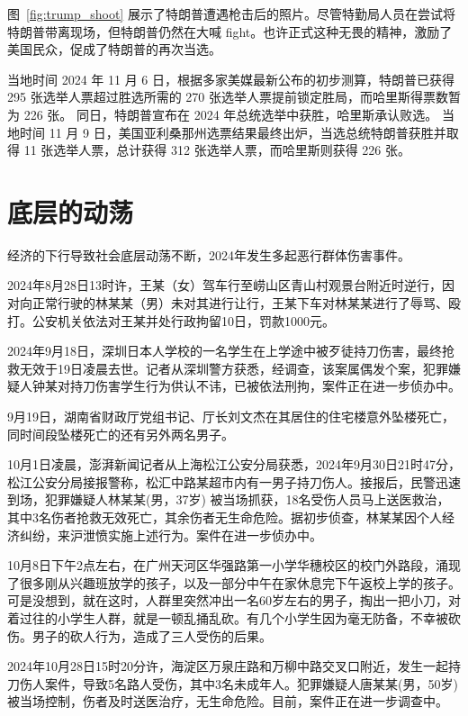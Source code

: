 图~\ref{fig:trump_shoot} 展示了特朗普遭遇枪击后的照片。尽管特勤局人员在尝试将特朗普带离现场，但特朗普仍然在大喊 fight。也许正式这种无畏的精神，激励了美国民众，促成了特朗普的再次当选。

当地时间 2024 年 11 月 6 日，根据多家美媒最新公布的初步测算，特朗普已获得 295 张选举人票超过胜选所需的 270 张选举人票提前锁定胜局，而哈里斯得票数暂为 226 张。 同日，特朗普宣布在 2024 年总统选举中获胜，哈里斯承认败选。 当地时间 11 月 9 日，美国亚利桑那州选票结果最终出炉，当选总统特朗普获胜并取得 11 张选举人票，总计获得 312 张选举人票，而哈里斯则获得 226 张。

\section{底层的动荡}

经济的下行导致社会底层动荡不断，2024年发生多起恶行群体伤害事件。

2024年8月28日13时许，王某（女）驾车行至崂山区青山村观景台附近时逆行，因对向正常行驶的林某某（男）未对其进行让行，王某下车对林某某进行了辱骂、殴打。公安机关依法对王某并处行政拘留10日，罚款1000元。

2024年9月18日，深圳日本人学校的一名学生在上学途中被歹徒持刀伤害，最终抢救无效于19日凌晨去世。记者从深圳警方获悉，经调查，该案属偶发个案，犯罪嫌疑人钟某对持刀伤害学生行为供认不讳，已被依法刑拘，案件正在进一步侦办中。

9月19日，湖南省财政厅党组书记、厅长刘文杰在其居住的住宅楼意外坠楼死亡，同时间段坠楼死亡的还有另外两名男子。

10月1日凌晨，澎湃新闻记者从上海松江公安分局获悉，2024年9月30日21时47分，松江公安分局接报警称，松汇中路某超市内有一男子持刀伤人。接报后，民警迅速到场，犯罪嫌疑人林某某(男，37岁) 被当场抓获，18名受伤人员马上送医救治，其中3名伤者抢救无效死亡，其余伤者无生命危险。据初步侦查，林某某因个人经济纠纷，来沪泄愤实施上述行为。案件在进一步侦办中。

10月8日下午2点左右，在广州天河区华强路第一小学华穗校区的校门外路段，涌现了很多刚从兴趣班放学的孩子，以及一部分中午在家休息完下午返校上学的孩子。可是没想到，就在这时，人群里突然冲出一名60岁左右的男子，掏出一把小刀，对着过往的小学生人群，就是一顿乱捅乱砍。有几个小学生因为毫无防备，不幸被砍伤。男子的砍人行为，造成了三人受伤的后果。

2024年10月28日15时20分许，海淀区万泉庄路和万柳中路交叉口附近，发生一起持刀伤人案件，导致5名路人受伤，其中3名未成年人。犯罪嫌疑人唐某某(男，50岁)被当场控制，伤者及时送医治疗，无生命危险。目前，案件正在进一步调查中。

